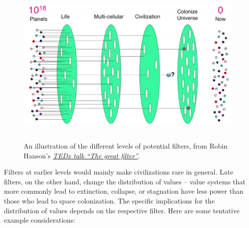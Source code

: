 \documentclass[]{article}
\begin{document}
\begin{figure}[h!]
    \centering
    \includegraphics[width=5.35625in,height=3.20307in]{figs/great-filter}
    \caption{An illustration of the different levels of
potential filters, from Robin Hanson's
\href{https://www.youtube.com/watch?v=aspMV6ERqpo}{\emph{TEDx talk ``The
great filter''}}.}
    \label{great-filter}
\end{figure}

Filters at earlier levels would mainly make civilizations rare in
general. Late filters, on the other hand, change the distribution of
values -- value systems that more commonly lead to extinction, collapse,
or stagnation have less power than those who lead to space colonization.
The specific implications for the distribution of values depends on the
respective filter. Here are some tentative example considerations:
\end{document}
